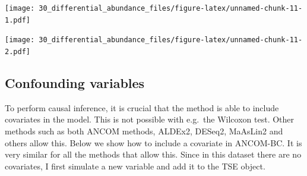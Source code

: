 \documentclass[
]{book}
\newenvironment{Shaded}{\begin{snugshade}}{\end{snugshade}}
\newcommand{\CommentTok}[1]{\textcolor[rgb]{0.56,0.35,0.01}{\textit{#1}}}
\newcommand{\DecValTok}[1]{\textcolor[rgb]{0.00,0.00,0.81}{#1}}
\newcommand{\NormalTok}[1]{#1}
\newcommand{\OtherTok}[1]{\textcolor[rgb]{0.56,0.35,0.01}{#1}}
\newcommand{\SpecialCharTok}[1]{\textcolor[rgb]{0.00,0.00,0.00}{#1}}
\begin{document}
\texttt{[image: 30\_differential\_abundance\_files/figure-latex/unnamed-chunk-11-1.pdf]}

\begin{Shaded}
\end{Shaded}

\texttt{[image: 30\_differential\_abundance\_files/figure-latex/unnamed-chunk-11-2.pdf]}

\hypertarget{confounding-variables}{%
\subsection{Confounding variables}\label{confounding-variables}}

To perform causal inference, it is crucial that the method is able to include
covariates in the model. This is not possible with e.g.~the Wilcoxon test.
Other methods such as both ANCOM methods, ALDEx2, DESeq2, MaAsLin2 and others
allow this. Below we show how to include a covariate in ANCOM-BC.
It is very similar for all the methods that allow this. Since in this dataset
there are no covariates, I first simulate a new variable and add it to the TSE
object.
\end{document}
